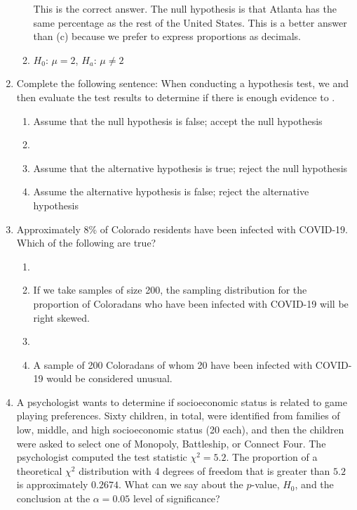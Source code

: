 \documentclass[12pt,fullpage]{amsart}
\begin{document}
\begin{enumerate}
\begin{enumerate}
{  This is the correct answer. The null hypothesis is that Atlanta has the same percentage as the rest of the United States. This is a better answer than (c) because we prefer to express proportions as decimals.}
  
\item $H_0$: $\mu = 2$, $H_a$: $\mu \neq 2$
\end{enumerate}

\vfill

\item
Complete the following sentence: When conducting a hypothesis test, we \underline{\hspace{1in}} and then evaluate the test results to determine if there is enough evidence to \underline{\hspace{1in}}.
\begin{enumerate}
\item	Assume that the null hypothesis is false; accept the null hypothesis
\item	{}
\item	Assume that the alternative hypothesis is true; reject the null hypothesis
\item	Assume the alternative hypothesis is false; reject the alternative hypothesis
\end{enumerate}
\vfill
     
\item Approximately 8\% of Colorado residents have been infected with COVID-19. Which of the following are true?
  \begin{enumerate}
  \item {}
  \item If we take samples of size 200, the sampling distribution for the proportion of Coloradans who have been infected with COVID-19 will be right skewed.
  \item {}
  \item A sample of 200 Coloradans of whom 20 have been infected with COVID-19 would be considered unusual.
  \end{enumerate}

\vfill
  
\item
A psychologist wants to determine if socioeconomic status is related to game playing preferences.  Sixty children, in total, were identified from families of low, middle, and high socioeconomic status (20 each), and then the children were asked to select one of Monopoly, Battleship, or Connect Four. The psychologist computed the test statistic $\chi^2=5.2$. The proportion of a theoretical $\chi^2$ distribution with 4 degrees of freedom that is greater than $5.2$ is approximately $0.2674$. What can we say about the $p$-value, $H_0$, and the conclusion at the $\alpha=0.05$ level of significance?


\end{enumerate}
\end{document}
